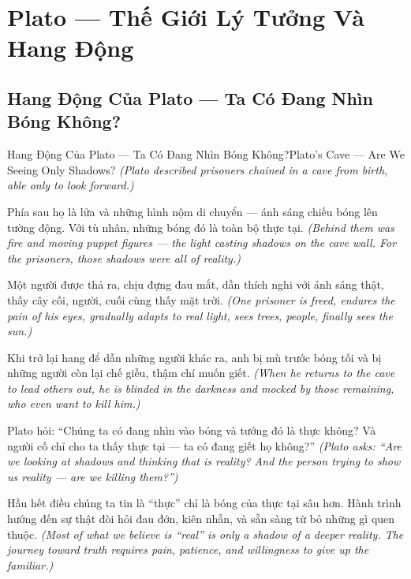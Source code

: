 \chapter{Plato — Thế Giới Lý Tưởng Và Hang Động}

\section{Hang Động Của Plato — Ta Có Đang Nhìn Bóng Không?}
\begin{truyen}{Hang Động Của Plato — Ta Có Đang Nhìn Bóng Không?}{Plato's Cave — Are We Seeing Only Shadows?}
\textit{(Plato described prisoners chained in a cave from birth, able only to look forward.)}

Phía sau họ là lửa và những hình nộm di chuyển — ánh sáng chiếu bóng lên tường động. Với tù nhân, những bóng đó là toàn bộ thực tại.
\textit{(Behind them was fire and moving puppet figures — the light casting shadows on the cave wall. For the prisoners, those shadows were all of reality.)}

Một người được thả ra, chịu đựng đau mắt, dần thích nghi với ánh sáng thật, thấy cây cối, người, cuối cùng thấy mặt trời.
\textit{(One prisoner is freed, endures the pain of his eyes, gradually adapts to real light, sees trees, people, finally sees the sun.)}

Khi trở lại hang để dẫn những người khác ra, anh bị mù trước bóng tối và bị những người còn lại chế giễu, thậm chí muốn giết.
\textit{(When he returns to the cave to lead others out, he is blinded in the darkness and mocked by those remaining, who even want to kill him.)}

Plato hỏi: ``Chúng ta có đang nhìn vào bóng và tưởng đó là thực không? Và người cố chỉ cho ta thấy thực tại — ta có đang giết họ không?''
\textit{(Plato asks: ``Are we looking at shadows and thinking that is reality? And the person trying to show us reality — are we killing them?'')}

\end{truyen}

\begin{baihoc}
Hầu hết điều chúng ta tin là ``thực'' chỉ là bóng của thực tại sâu hơn. Hành trình hướng đến sự thật đòi hỏi đau đớn, kiên nhẫn, và sẵn sàng từ bỏ những gì quen thuộc.
\textit{(Most of what we believe is ``real'' is only a shadow of a deeper reality. The journey toward truth requires pain, patience, and willingness to give up the familiar.)}
\end{baihoc}
\ngancach

